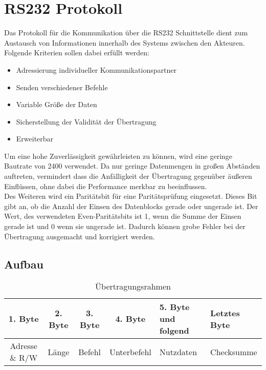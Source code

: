 \section{RS232 Protokoll}
\label{section_RS232_Protokoll}
Das Protokoll für die Kommunikation über die RS232 Schnittstelle dient zum Austausch von Informationen innerhalb des Systems zwischen den Akteuren. \\

Folgende Kriterien sollen dabei erfüllt werden:
\begin{itemize}
\item Adressierung individueller Kommunikationspartner
\item Senden verschiedener Befehle
\item Variable Größe der Daten
\item Sicherstellung der Validität der Übertragung
\item Erweiterbar
\end{itemize}



Um eine hohe Zuverlässigkeit gewährleisten zu können, wird eine geringe Bautrate von 2400 verwendet. Da nur geringe Datenmengen in großen Abständen auftreten, vermindert dass die Anfälligkeit der Übertragung gegenüber äußeren Einflüssen, ohne dabei die Performance merkbar zu beeinflussen.\\
Des Weiteren wird ein Paritätsbit für eine Paritätsprüfung eingesetzt. Dieses Bit gibt an, ob die Anzahl der Einsen des Datenblocks gerade oder ungerade ist. Der Wert, des verwendeten Even-Paritätsbits ist 1, wenn die Summe der Einsen gerade ist und 0 wenn sie ungerade ist. Dadurch können grobe Fehler bei der Übertragung ausgemacht und korrigiert werden.\\

\subsection{Aufbau}
\begin{table}[H]
\begin{center}
\begin{tabularx}{\textwidth}{|c|c|c|c|X|X|}\hline
 1. Byte & 2. Byte & 3. Byte & 4. Byte & 5. Byte und folgend & Letztes Byte\\ \hline
  Adresse \& R/W & Länge & Befehl & Unterbefehl & Nutzdaten & Checksumme\\ \hline
\end{tabularx}
\caption{Übertragungsrahmen}
\label{table_Frame}
\end{center}
\end{table}

